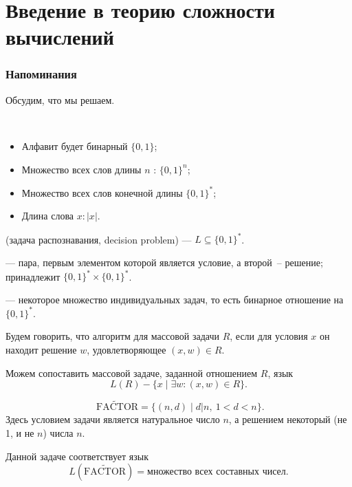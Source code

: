 \chapter{Введение в теорию сложности вычислений}
\subsection{Напоминания}
Обсудим, что мы решаем.
\begin{name}
	~\begin{itemize}
		\item Алфавит будет бинарный  $\{0, 1\}$;
		\item Множество всех слов длины $ n$ : $ \{0, 1\}^{n}$;
		\item Множество всех слов конечной длины  $ \{0, 1\}^{*}$;
		\item Длина слова $ x\colon  \lvert x \rvert $.
	\end{itemize}
\end{name}

\begin{defn}
	 (задача распознавания, decision problem) ---  $ L \subseteq \{0, 1\}^{*}$.

	\noindent
	 --- пара, первым элементом которой является условие, а второй~-- решение; принадлежит $ \{0, 1\}^{*} \times \{0, 1\}^{*}$.

	\noindent
	 --- некоторое множество индивидуальных задач, то есть бинарное отношение на $ \{0, 1\}^{*}$.
\end{defn}

\begin{defn}
	Будем говорить, что алгоритм  для массовой задачи $ R$, если для условия $ x$ он находит решение $ w$, удовлетворяющее $ (x, w) \in R$.

	\noindent
	Можем сопоставить массовой задаче, заданной отношением $ R$, язык
	\[
		L(R) - \{x \mid \exists w\colon (x, w) \in R\}
	.\]
\end{defn}

\begin{ex}
	\[
		\widetilde{\text{ FACTOR}} = \{(n, d) \mid d | n, ~ 1<d<n\}
	.\]
	Здесь условием задачи является натуральное число  $ n$, а решением некоторый (не 1, и не $ n$) числа $ n$.

	Данной задаче соответствует язык
	\[
		L(\widetilde{\text{FACTOR}}) = \text{множество всех составных чисел}
	.\]
\end{ex}

